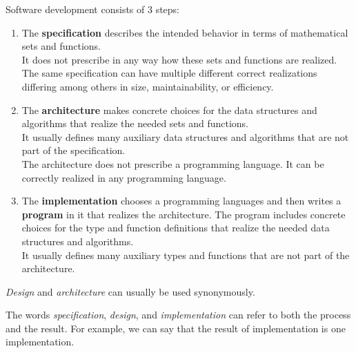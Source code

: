 Software development consists of $3$ steps:
\begin{enumerate}
\item The \textbf{specification} describes the intended behavior in terms of mathematical sets and functions.\\
It does not prescribe in any way how these sets and functions are realized.
The same specification can have multiple different correct realizations differing among others in size, maintainability, or efficiency.
\item The \textbf{architecture} makes concrete choices for the data structures and algorithms that realize the needed sets and functions.\\
It usually defines many auxiliary data structures and algorithms that are not part of the specification.\\
The architecture does not prescribe a programming language. It can be correctly realized in any programming language.
\item The \textbf{implementation} chooses a programming languages and then writes a \textbf{program} in it that realizes the architecture.
The program includes concrete choices for the type and function definitions that realize the needed data structures and algorithms.\\
It usually defines many auxiliary types and functions that are not part of the architecture.
\end{enumerate}

\begin{terminology}
\emph{Design} and \emph{architecture} can usually be used synonymously.

The words \emph{specification}, \emph{design}, and \emph{implementation} can refer to both the process and the result.
For example, we can say that the result of implementation is one implementation.
\end{terminology}

